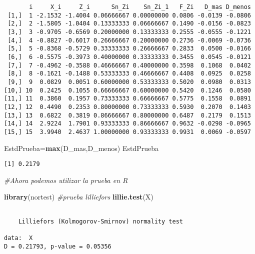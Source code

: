 \documentclass[a4paper,oneside,openany]{book}
\newenvironment{Shaded}{\begin{snugshade}}{\end{snugshade}}
\newcommand{\KeywordTok}[1]{\textcolor[rgb]{0.13,0.29,0.53}{\textbf{#1}}}
\newcommand{\CommentTok}[1]{\textcolor[rgb]{0.56,0.35,0.01}{\textit{#1}}}
\newcommand{\NormalTok}[1]{#1}
\begin{document}
\begin{verbatim}
       i     X_i     Z_i      Sn_Zi    Sn_Zi_1   F_Zi   D_mas D_menos
 [1,]  1 -2.1532 -1.4004 0.06666667 0.00000000 0.0806 -0.0139 -0.0806
 [2,]  2 -1.5805 -1.0404 0.13333333 0.06666667 0.1490 -0.0156 -0.0823
 [3,]  3 -0.9705 -0.6569 0.20000000 0.13333333 0.2555 -0.0555 -0.1221
 [4,]  4 -0.8827 -0.6017 0.26666667 0.20000000 0.2736 -0.0069 -0.0736
 [5,]  5 -0.8368 -0.5729 0.33333333 0.26666667 0.2833  0.0500 -0.0166
 [6,]  6 -0.5575 -0.3973 0.40000000 0.33333333 0.3455  0.0545 -0.0121
 [7,]  7 -0.4962 -0.3588 0.46666667 0.40000000 0.3598  0.1068  0.0402
 [8,]  8 -0.1621 -0.1488 0.53333333 0.46666667 0.4408  0.0925  0.0258
 [9,]  9  0.0829  0.0051 0.60000000 0.53333333 0.5020  0.0980  0.0313
[10,] 10  0.2425  0.1055 0.66666667 0.60000000 0.5420  0.1246  0.0580
[11,] 11  0.3860  0.1957 0.73333333 0.66666667 0.5775  0.1558  0.0891
[12,] 12  0.4490  0.2353 0.80000000 0.73333333 0.5930  0.2070  0.1403
[13,] 13  0.6822  0.3819 0.86666667 0.80000000 0.6487  0.2179  0.1513
[14,] 14  2.9224  1.7901 0.93333333 0.86666667 0.9632 -0.0298 -0.0965
[15,] 15  3.9940  2.4637 1.00000000 0.93333333 0.9931  0.0069 -0.0597
\end{verbatim}

\begin{Shaded}
\begin{Highlighting}[]
\NormalTok{EstdPrueba=}\KeywordTok{max}\NormalTok{(D_mas,D_menos)}
\NormalTok{EstdPrueba}
\end{Highlighting}
\end{Shaded}

\begin{verbatim}
[1] 0.2179
\end{verbatim}

\begin{Shaded}
\begin{Highlighting}[]
\CommentTok{#Ahora podemos utilizar la prueba en R}


\KeywordTok{library}\NormalTok{(nortest) }\CommentTok{#prueba lilliefors}
\KeywordTok{lillie.test}\NormalTok{(X)}
\end{Highlighting}
\end{Shaded}

\begin{verbatim}

    Lilliefors (Kolmogorov-Smirnov) normality test

data:  X
D = 0.21793, p-value = 0.05356
\end{verbatim}
\end{document}
